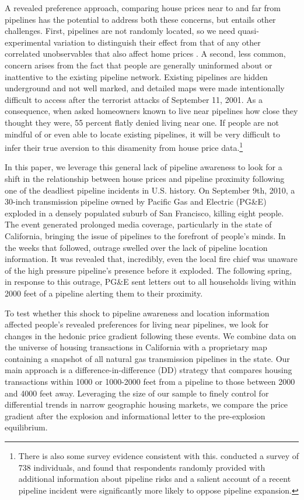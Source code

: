 \documentclass[12pt]{article}
\begin{document}
A revealed preference approach, comparing house prices near to and far from pipelines has the potential to address both these concerns, but entails other challenges. First, pipelines are not randomly located, so we need quasi-experimental variation to distinguish their effect from that of any other correlated unobservables that also affect home prices \citep{parmeter_quasi-experiments_2013}. A second, less common, concern arises from the fact that people are generally uninformed about or inattentive to the existing pipeline network. Existing pipelines are hidden underground and not well marked, and detailed maps were made intentionally difficult to access after the terrorist attacks of September 11, 2001. As a consequence, when \citet{hansen_environmental_2006} asked homeowners known to live near pipelines how close they thought they were, 55 percent flatly denied living near one. If people are not mindful of or even able to locate existing pipelines, it will be very difficult to infer their true aversion to this disamenity from house price data.\footnote{There is also some survey evidence consistent with this. \citet{brogan_evaluating_2017} conducted a survey of 738 individuals, and found that respondents randomly provided with additional information about pipeline risks and a salient account of a recent pipeline incident were significantly more likely to oppose pipeline expansion.} 

In this paper, we leverage this general lack of pipeline awareness to look for a shift in the relationship between house prices and pipeline proximity following one of the deadliest pipeline incidents in U.S. history. On September 9th, 2010, a 30-inch transmission pipeline owned by Pacific Gas and Electric (PG\&E) exploded in a densely populated suburb of San Francisco, killing eight people. The event generated prolonged media coverage, particularly in the state of California, bringing the issue of pipelines to the forefront of people's minds. In the weeks that followed, outrage swelled over the lack of pipeline location information. It was revealed that, incredibly, even the local fire chief was unaware of the high pressure pipeline's presence before it exploded. The following spring, in response to this outrage, PG\&E sent letters out to all households living within 2000 feet of a pipeline alerting them to their proximity.

To test whether this shock to pipeline awareness and location information affected people's revealed preferences for living near pipelines, we look for changes in the hedonic price gradient following these events. We combine data on the universe of housing transactions in California with a proprietary map containing a snapshot of all natural gas transmission pipelines in the state. Our main approach is a difference-in-difference (DD) strategy that compares housing transactions within 1000 or 1000-2000 feet from a pipeline to those between 2000 and 4000 feet away. Leveraging the size of our sample to finely control for differential trends in narrow geographic housing markets, we compare the price gradient after the explosion and informational letter to the pre-explosion equilibrium. 
\end{document}
